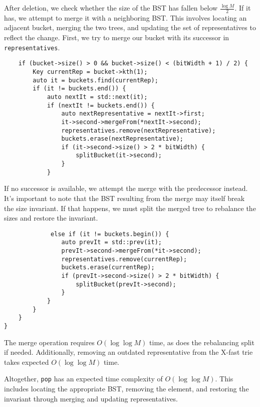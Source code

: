 After deletion, we check whether the size of the BST has fallen below \( \frac{\log M}{2} \). If it has, we attempt to merge it with a neighboring BST. This involves locating an adjacent bucket, merging the two trees, and updating the set of representatives to reflect the change. First, we try to merge our bucket with its successor in \texttt{representatives}.

\begin{verbatim}
    if (bucket->size() > 0 && bucket->size() < (bitWidth + 1) / 2) {
        Key currentRep = bucket->kth(1);
        auto it = buckets.find(currentRep);
        if (it != buckets.end()) {
            auto nextIt = std::next(it);
            if (nextIt != buckets.end()) {
                auto nextRepresentative = nextIt->first;
                it->second->mergeFrom(*nextIt->second);
                representatives.remove(nextRepresentative);
                buckets.erase(nextRepresentative);
                if (it->second->size() > 2 * bitWidth) {
                    splitBucket(it->second);
                }
            }
\end{verbatim}

If no successor is available, we attempt the merge with the predecessor instead. It's important to note that the BST resulting from the merge may itself break the size invariant. If that happens, we must split the merged tree to rebalance the sizes and restore the invariant.


\begin{verbatim}
             else if (it != buckets.begin()) {
                auto prevIt = std::prev(it);
                prevIt->second->mergeFrom(*it->second);
                representatives.remove(currentRep);
                buckets.erase(currentRep);
                if (prevIt->second->size() > 2 * bitWidth) {
                    splitBucket(prevIt->second);
                }
            }
        }
    }
}
\end{verbatim}

The merge operation requires \( O(\log \log M) \) time, as does the rebalancing split if needed. Additionally, removing an outdated representative from the X-fast trie takes expected \( O(\log \log M) \) time.

Altogether, \texttt{pop} has an expected time complexity of \( O(\log \log M) \). This includes locating the appropriate BST, removing the element, and restoring the invariant through merging and updating representatives.
